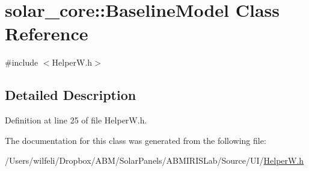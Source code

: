\hypertarget{classsolar__core_1_1_baseline_model}{}\section{solar\+\_\+core\+:\+:Baseline\+Model Class Reference}
\label{classsolar__core_1_1_baseline_model}


{\ttfamily \#include $<$Helper\+W.\+h$>$}



\subsection{Detailed Description}


Definition at line 25 of file Helper\+W.\+h.



The documentation for this class was generated from the following file\+:\begin{DoxyCompactItemize}
\item 
/\+Users/wilfeli/\+Dropbox/\+A\+B\+M/\+Solar\+Panels/\+A\+B\+M\+I\+R\+I\+S\+Lab/\+Source/\+U\+I/\hyperlink{_helper_w_8h}{Helper\+W.\+h}\end{DoxyCompactItemize}
